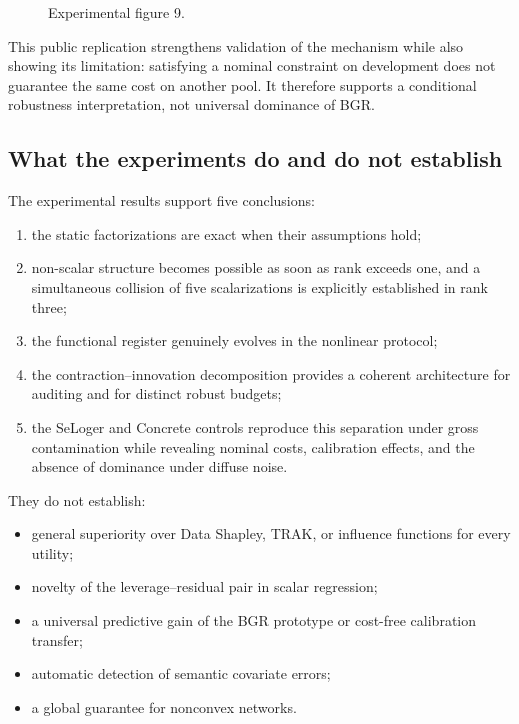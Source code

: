 \begin{figure}[htbp]
\centering{}
\caption{Experimental figure 9.}\label{fig:concrete-public}
\end{figure}

This public replication strengthens validation of the mechanism while also showing its limitation: satisfying a nominal constraint on development does not guarantee the same cost on another pool. It therefore supports a conditional robustness interpretation, not universal dominance of BGR.

\subsection{What the experiments do and do not establish}
The experimental results support five conclusions:
\begin{enumerate}
  \item the static factorizations are exact when their assumptions hold;
  \item non-scalar structure becomes possible as soon as rank exceeds one, and a simultaneous collision of five scalarizations is explicitly established in rank three;
  \item the functional register genuinely evolves in the nonlinear protocol;
  \item the contraction--innovation decomposition provides a coherent architecture for auditing and for distinct robust budgets;
  \item the SeLoger and Concrete controls reproduce this separation under gross contamination while revealing nominal costs, calibration effects, and the absence of dominance under diffuse noise.
\end{enumerate}
They do not establish:
\begin{itemize}
  \item general superiority over Data Shapley, TRAK, or influence functions for every utility;
  \item novelty of the leverage--residual pair in scalar regression;
  \item a universal predictive gain of the BGR prototype or cost-free calibration transfer;
  \item automatic detection of semantic covariate errors;
  \item a global guarantee for nonconvex networks.
\end{itemize}

